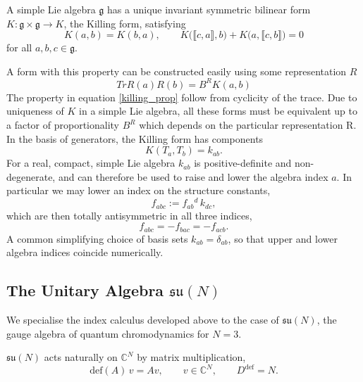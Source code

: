 \begin{definition}
A simple Lie algebra $\mathfrak g$ has a unique invariant symmetric
bilinear form $K : \mathfrak g \times \mathfrak g \to K$, the Killing
form, satisfying
\begin{equation}\label{killing_prop}
    K(a,b) = K(b,a), \qquad
    K\big(\llbracket c,a\rrbracket, b\big) + K\big(a, \llbracket c,b\rrbracket\big) = 0
\end{equation}
for all $a,b,c \in \mathfrak g$.
\end{definition}
A form with this property can be constructed easily using some representation $R$
\begin{equation}
    Tr R(a)R(b) =B^R K(a,b)
\end{equation}
The property in equation \ref{killing_prop} follow from cyclicity of the trace. Due to uniqueness of
$K$ in a simple Lie algebra, all these forms must be equivalent up to a factor of proportionality $B^R$ which depends on the particular representation R.
In the basis of generators, the Killing form has components
\begin{equation}
    K(T_a, T_b) = k_{ab}.
\end{equation}
For a real, compact, simple Lie algebra $k_{ab}$ is positive-definite
and non-degenerate, and can therefore be used to raise and lower the
algebra index $a$. In particular we may lower an index on the
structure constants,
\begin{equation}
    f_{abc} := f_{ab}{}^{d}\, k_{dc},
\end{equation}
which are then totally antisymmetric in all three indices,
\begin{equation}
    f_{abc} = -f_{bac} = -f_{acb}.
\end{equation}
A common simplifying choice of basis sets $k_{ab} = \delta_{ab}$, so
that upper and lower algebra indices coincide numerically.

\subsection{The Unitary Algebra \texorpdfstring{$\mathfrak{su}(N)$}{su(N)}}

We specialise the index calculus developed above to the case of
$\mathfrak{su}(N)$, the gauge algebra of quantum chromodynamics for
$N = 3$.

\begin{definition}
$\mathfrak{su}(N)$ acts naturally on $\mathbb{C}^N$ by matrix
multiplication,
\begin{equation}
    \mathrm{def}(A)\, v = Av, \qquad v \in \mathbb{C}^N, \qquad D^{\mathrm{def}} = N.
\end{equation}
\end{definition}

